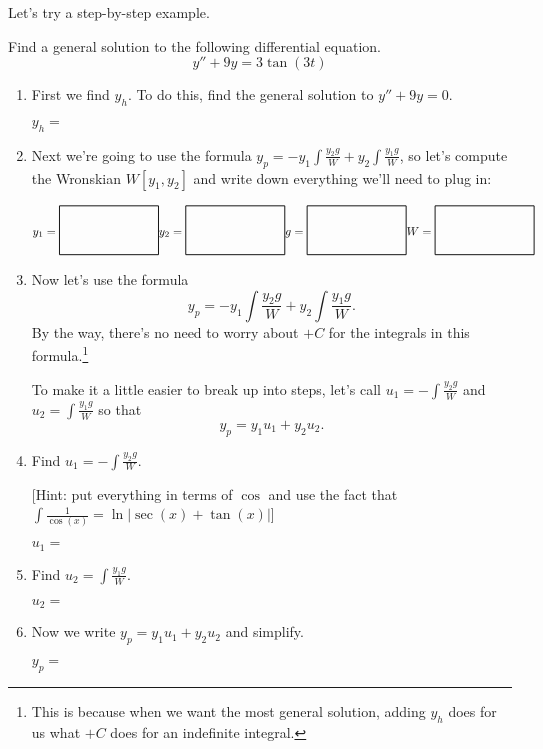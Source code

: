 \documentclass[12pt]{article}
\begin{document}
Let's try a step-by-step example.

\begin{enumerate}
  \setcounter{problemnumber}{0}
	\Problem Find a general solution to the following differential equation.
	$$y''+9y=3\tan(3t)$$
	\begin{enumerate}
		\item First we find $y_h$. To do this, find the general solution to 
		$y''+9y=0$. 
		\begin{flushright}
		$y_h=$ 
		\end{flushright}
		\vfill
		
		\pagebreak
		\item Next we're going to use the formula $y_p = -y_1\int\frac{y_2g}{W} + y_2\int\frac{y_1g}{W}$, so let's compute the Wronskian $W[y_1, y_2]$	and write down everything we'll need to plug in:
		
		$\hfill y_1= \answerbox{3} 
		\hfill y_2= \answerbox{3} 
		\hfill g= \answerbox{3} 
		\hfill W= \answerbox{3} 
		\hfill $
		\vfill
		
		\item Now let's use the formula 
		$$ y_p = -y_1\int\frac{y_2g}{W} + y_2\int\frac{y_1g}{W}.$$
		By the way, there's no need to worry about $+C$ for the integrals in this formula.\footnote{This is because when we want the most general solution, adding $y_h$ does for us what $+C$ does for an indefinite integral.}
		
		To make it a little easier to break up into steps, let's call $\displaystyle u_1=-\int\frac{y_2g}{W}$ and $\displaystyle u_2=\int\frac{y_1g}{W}$ so that 
		$$y_p = y_1u_1 + y_2u_2.$$
		
		\item[] Find $\displaystyle u_1=-\int\frac{y_2g}{W}$. %
		
		{\small [Hint: put everything in terms of $\cos$ and use the fact that $\int\frac{1}{\cos(x)}=\ln|\sec(x)+\tan(x)|$]}
		\begin{flushright}
		$u_1=$ \answerbox{8}
		\end{flushright}
		\vfill
		\vfill		
		
		\item Find $\displaystyle u_2=\int\frac{y_1g}{W}$. %
		\begin{flushright}
		$u_2=$ \answerbox{8}
		\end{flushright}
		\vfill
		
		
		\pagebreak		
		\item Now we write $y_p=y_1u_1+y_2u_2$ and simplify.
		\begin{flushright}
		$y_p=$ \answerbox{12}
		\end{flushright}
		\vspace*{72pt}


\end{enumerate}
\end{enumerate}
\end{document}
